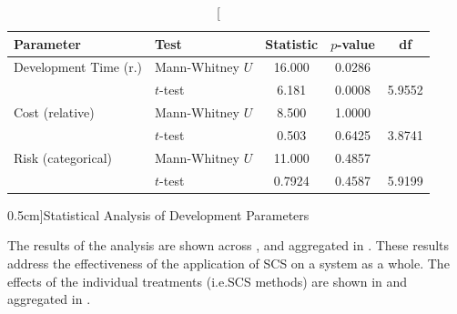 \documentclass[a4paper,nobib,justified,final]{tufte-book}
\begin{document}
\begin{table}[ht]
\centering
\begin{tabular}{llSSS}
\toprule
\textbf{Parameter} & \textbf{Test} & \textbf{Statistic} & \textbf{$p$-value} & \textbf{df} \\
\midrule
Development Time (r.) & Mann-Whitney \(U\) & 16.000 & 0.0286 & \text{---} \\
                 & \(t\)-test         & 6.181  & 0.0008 & 5.9552 \\
\addlinespace
Cost (relative)  & Mann-Whitney \(U\) & 8.500  & 1.0000 & \text{---} \\
                 & \(t\)-test         & 0.503 & 0.6425 & 3.8741 \\
\addlinespace
Risk (categorical)& Mann-Whitney \(U\) & 11.000 & 0.4857 & \text{---} \\
                 & \(t\)-test         & 0.7924  & 0.4587 & 5.9199 \\
\bottomrule
\end{tabular}

\caption[][0.5cm]{Statistical Analysis of Development Parameters}
\label{tab:stat_results}
\end{table}%



The results of the analysis are shown across , and aggregated in . 
These results address the effectiveness of the application of \acs{SCS} on a system as a whole. The effects of the individual treatments (i.e.\@ \acs{SCS} methods) are shown in  and aggregated in .
\end{document}
